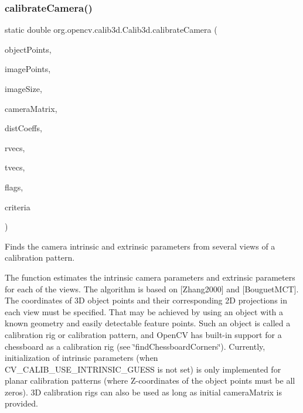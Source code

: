 \subsubsection{\texorpdfstring{calibrate\+Camera()}{calibrateCamera()}\hspace{0.1cm}{\footnotesize\ttfamily [1/3]}}
{\footnotesize\ttfamily static double org.\+opencv.\+calib3d.\+Calib3d.\+calibrate\+Camera (\begin{DoxyParamCaption}\item[{List$<$ \mbox{\hyperlink{classorg_1_1opencv_1_1core_1_1_mat}{Mat}} $>$}]{object\+Points,  }\item[{List$<$ \mbox{\hyperlink{classorg_1_1opencv_1_1core_1_1_mat}{Mat}} $>$}]{image\+Points,  }\item[{\mbox{\hyperlink{classorg_1_1opencv_1_1core_1_1_size}{Size}}}]{image\+Size,  }\item[{\mbox{\hyperlink{classorg_1_1opencv_1_1core_1_1_mat}{Mat}}}]{camera\+Matrix,  }\item[{\mbox{\hyperlink{classorg_1_1opencv_1_1core_1_1_mat}{Mat}}}]{dist\+Coeffs,  }\item[{List$<$ \mbox{\hyperlink{classorg_1_1opencv_1_1core_1_1_mat}{Mat}} $>$}]{rvecs,  }\item[{List$<$ \mbox{\hyperlink{classorg_1_1opencv_1_1core_1_1_mat}{Mat}} $>$}]{tvecs,  }\item[{int}]{flags,  }\item[{\mbox{\hyperlink{classorg_1_1opencv_1_1core_1_1_term_criteria}{Term\+Criteria}}}]{criteria }\end{DoxyParamCaption})\hspace{0.3cm}{\ttfamily [static]}}

Finds the camera intrinsic and extrinsic parameters from several views of a calibration pattern.

The function estimates the intrinsic camera parameters and extrinsic parameters for each of the views. The algorithm is based on \mbox{[}Zhang2000\mbox{]} and \mbox{[}Bouguet\+M\+CT\mbox{]}. The coordinates of 3D object points and their corresponding 2D projections in each view must be specified. That may be achieved by using an object with a known geometry and easily detectable feature points. Such an object is called a calibration rig or calibration pattern, and Open\+CV has built-\/in support for a chessboard as a calibration rig (see \char`\"{}find\+Chessboard\+Corners\char`\"{}). Currently, initialization of intrinsic parameters (when {\ttfamily C\+V\+\_\+\+C\+A\+L\+I\+B\+\_\+\+U\+S\+E\+\_\+\+I\+N\+T\+R\+I\+N\+S\+I\+C\+\_\+\+G\+U\+E\+SS} is not set) is only implemented for planar calibration patterns (where Z-\/coordinates of the object points must be all zeros). 3D calibration rigs can also be used as long as initial {\ttfamily camera\+Matrix} is provided.


